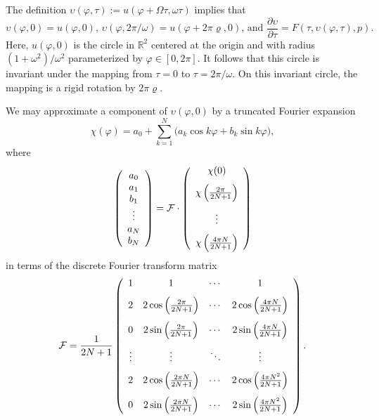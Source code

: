 The definition $\upsilon(\varphi,\tau):=u(\varphi+ \Omega\tau,\omega\tau)$ implies that
\begin{equation}
\upsilon(\varphi,0)=u(\varphi,0),\,\upsilon(\varphi,2\pi/\omega)=u(\varphi+2\pi\varrho,0)\mbox{, and }
\frac{\partial\upsilon}{\partial\tau}=F(\tau,\upsilon(\varphi,\tau),p).
\end{equation}
Here, $u(\varphi,0)$ is the circle in $\mathbb{R}^2$ centered at the origin and with radius $(1+\omega^2)/\omega^2$ parameterized by $\varphi\in[0,2\pi]$. It follows that this circle is invariant under the mapping from $\tau=0$ to $\tau=2\pi/\omega$. On this invariant circle, the mapping is a rigid rotation by $2\pi\varrho$.

We may approximate a component of $\upsilon(\varphi,0)$ by a truncated Fourier expansion
\begin{equation}
\chi(\varphi)=a_0+\sum_{k=1}^N \bigg(a_k\cos k\varphi+b_k\sin k\varphi\bigg),
\end{equation}
where
\begin{equation}
\left(\begin{array}{c}a_0\\a_1\\b_1\\\vdots\\a_N\\b_N\end{array}\right)=\mathcal{F}\cdot \left(\begin{array}{c}\vspace{.1in}\chi(0)\\\vspace{.1in}\chi\left(\frac{2\pi}{2N+1}\right)\\\vspace{.1in}\vdots\\\chi\left(\frac{4\pi N}{2N+1}\right)\end{array}\right)
\end{equation}
in terms of the discrete Fourier transform matrix
\begin{equation}
\mathcal{F}=\frac{1}{2N+1}\left(\begin{array}{cccc}\vspace{.1in}1 & 1 & \cdots & 1\\\vspace{.1in}2 & 2\cos\left(\frac{2\pi}{2N+1}\right) & \cdots & 2\cos\left(\frac{4\pi N}{2N+1}\right)\\\vspace{.1in}0 & 2\sin\left(\frac{2\pi}{2N+1}\right) & \cdots & 2\sin\left(\frac{4\pi N}{2N+1}\right)\\\vspace{.1in}\vdots & \vdots & \ddots & \vdots\\\vspace{.1in}
2 & 2\cos\left(\frac{2\pi N}{2N+1}\right) & \cdots & 2\cos\left(\frac{4\pi N^2}{2N+1}\right)\\0 & 2\sin\left(\frac{2\pi N}{2N+1}\right) & \cdots & 2\sin\left(\frac{4\pi N^2}{2N+1}\right)
\end{array}\right).
\end{equation}
